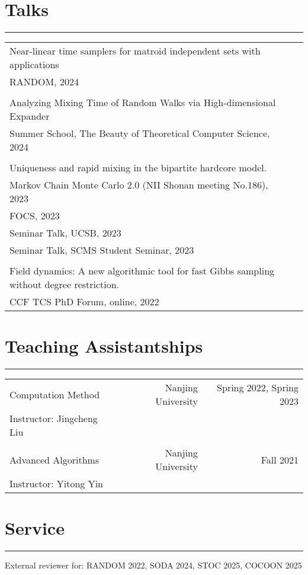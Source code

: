 \documentclass{article}
\begin{document}
\section*{Talks}
\vspace{-1em} \hrule \vspace{1em}

\begin{tabularx}{\textwidth}{@{\hskip 0pt}lX@{\hskip 0pt}}
Near-linear time samplers for matroid independent sets with applications \\
\hspace{20pt} RANDOM, 2024 \\
\\
Analyzing Mixing Time of Random Walks via High-dimensional Expander \\
\hspace{20pt} Summer School, The Beauty of Theoretical Computer Science, 2024\\
\\
Uniqueness and rapid mixing in the bipartite hardcore model. & \\
\hspace{20pt} Markov Chain Monte Carlo 2.0 (NII Shonan meeting No.186), 2023 \\
\hspace{20pt} FOCS, 2023\\
\hspace{20pt} Seminar Talk, UCSB, 2023\\
\hspace{20pt} Seminar Talk, SCMS Student Seminar, 2023\\
\\
Field dynamics: A new algorithmic tool for fast Gibbs sampling without degree restriction. & \\
\hspace{20pt} CCF TCS PhD Forum, online, 2022
\end{tabularx}

\section*{Teaching Assistantships}
\vspace{-1em} \hrule \vspace{1em}

\begin{tabularx}{\textwidth}{@{\hskip 0pt}lXrr@{\hskip 0pt}}
  \large Computation Method & & Nanjing University & Spring 2022, Spring 2023 \\
  Instructor: Jingcheng Liu \\
  \\
  \large Advanced Algorithms & & Nanjing University & Fall 2021 \\ 
  Instructor: Yitong Yin
\end{tabularx}

\section*{Service}
\vspace{-1em} \hrule \vspace{1em}

External reviewer for: RANDOM 2022, SODA 2024, STOC 2025, COCOON 2025
\end{document}
